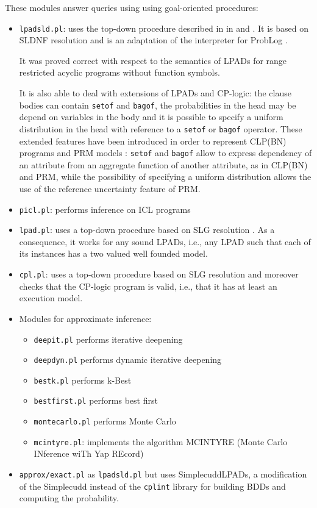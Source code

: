 \documentclass[a4paper,10pt]{article}
\newcommand{\href}[2]{\Link[#1]{}{} #2 \EndLink}
\begin{document}
These modules answer queries using using goal-oriented procedures:
\begin{itemize}
\item \texttt{lpadsld.pl}: uses the top-down procedure described in 
in \cite{Rig-AIIA07-IC} and \cite{Rig-RCRA07-IC}. It is based on SLDNF resolution and is an adaptation of the interpreter for ProbLog \cite{DBLP:conf/ijcai/RaedtKT07}.

It was proved correct \cite{Rig-RCRA07-IC} with respect to the semantics of LPADs for range restricted acyclic programs \cite{DBLP:journals/ngc/AptB91} without function symbols.

It is also able to deal with extensions of LPADs and CP-logic: the clause bodies can contain \texttt{setof} and \texttt{bagof}, the probabilities in the head may be depend on variables in the body and it is possible to specify a uniform distribution in the head with reference to a \texttt{setof} or \texttt{bagof} operator. These extended features have been introduced in order to represent CLP(BN) \cite{SanPagQaz03-UAI-IC} programs and PRM models \cite{Getoor+al:JMLR02}:
\texttt{setof} and \texttt{bagof} allow to express dependency of an attribute from an aggregate function of another attribute, as in CLP(BN)  and PRM, while the possibility of specifying a uniform distribution allows the use of the reference uncertainty feature of PRM.
\item \texttt{picl.pl}: performs inference on ICL programs \cite{Rig09-LJIGPL-IJ}
\item \texttt{lpad.pl}: uses  a top-down procedure based on SLG resolution \cite{DBLP:journals/jacm/ChenW96}. As a consequence, it works for any sound LPADs, i.e., any LPAD such that each of its instances has a two valued well founded model. 
\item \texttt{cpl.pl}: uses a top-down procedure based on SLG resolution and moreover checks that the CP-logic program is valid, i.e., that it has at least an execution model.
\item Modules for approximate inference:
\begin{itemize}
\item \texttt{deepit.pl} performs iterative deepening \cite{BraRig10-ILP10-IC}
\item \texttt{deepdyn.pl} performs  dynamic iterative deepening \cite{BraRig10-ILP10-IC}
\item \texttt{bestk.pl} performs  k-Best \cite{BraRig10-ILP10-IC}
\item \texttt{bestfirst.pl} performs  best first \cite{BraRig10-ILP10-IC}
\item \texttt{montecarlo.pl} performs  Monte Carlo \cite{BraRig10-ILP10-IC}
\item \texttt{mcintyre.pl}: implements the algorithm MCINTYRE (Monte Carlo INference wiTh Yap REcord) \cite{Rig11-CILC11-NC}
\end{itemize}
\item \texttt{approx/exact.pl} as \texttt{lpadsld.pl} but uses  SimplecuddLPADs, a modification of the \href{http://dtai.cs.kuleuven.be/problog/download.html}{Simplecudd} instead of the \texttt{cplint} library for building BDDs and computing the probability.
\end{itemize}
\end{document}
